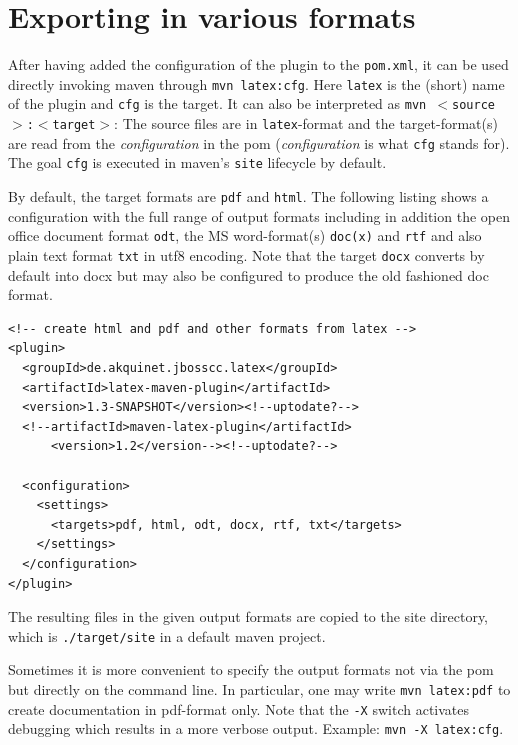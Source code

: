 \documentclass[12pt]{book}
\newcommand{\gls}[1]{#1}
\begin{document}
\section{Exporting in various formats}\label{chap:stableUsage}


After having added the configuration of the plugin to the \texttt{pom.xml}, 
it can be used directly invoking maven through 
\texttt{mvn latex:cfg}. 
Here \texttt{latex} is the (short) name of the plugin and \texttt{cfg} is the target. 
It can also be interpreted as \texttt{mvn $<$source$>$:$<$target$>$}: 
The source files are in \texttt{latex}-format and the target-format(s) 
are read from the {\em configuration} in the pom 
({\em configuration} is what \texttt{cfg} stands for). 
The goal \texttt{cfg} is executed in maven's \texttt{site} lifecycle by default. 

By default, the target formats are \texttt{pdf} and \texttt{html}. 
The following listing shows a configuration 
with the full range of output formats including in addition 
the open office document format \texttt{odt}, 
the MS word-format(s) \texttt{doc(x)} and \texttt{rtf}
and also plain text format \texttt{txt} in utf8 encoding. 
Note that the target \texttt{docx} converts by default into \gls{docx} 
but may also be configured to produce the old fashioned \gls{doc} format. 
%
\lstset{language=xml, basicstyle=\small}
\begin{lstlisting}
<!-- create html and pdf and other formats from latex -->
<plugin>
  <groupId>de.akquinet.jbosscc.latex</groupId>
  <artifactId>latex-maven-plugin</artifactId>
  <version>1.3-SNAPSHOT</version><!--uptodate?-->
  <!--artifactId>maven-latex-plugin</artifactId>
      <version>1.2</version--><!--uptodate?-->
	
  <configuration>
    <settings>
      <targets>pdf, html, odt, docx, rtf, txt</targets>
    </settings>
  </configuration>
</plugin>
\end{lstlisting}

The resulting files in the given output formats 
are copied to the site directory, 
which is \texttt{./target/site} in a default maven project. 

Sometimes it is more convenient 
to specify the output formats not via the pom 
but directly on the command line. 
In particular, one may write \texttt{mvn latex:pdf} to create documentation 
in pdf-format only. 
Note that the \texttt{-X} switch activates debugging 
which results in a more verbose output. 
Example: \texttt{mvn -X latex:cfg}. 
\end{document}

